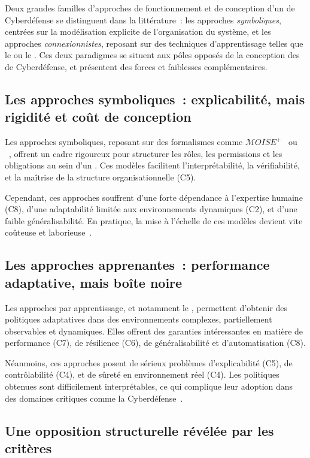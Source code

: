 Deux grandes familles d'approches de fonctionnement et de conception d'un  de Cyberdéfense se distinguent dans la littérature~: les approches \textit{symboliques}, centrées sur la modélisation explicite de l'organisation du système, et les approches \textit{connexionnistes}, reposant sur des techniques d'apprentissage telles que le  ou le . Ces deux paradigmes se situent aux pôles opposés de la conception des  de Cyberdéfense, et présentent des forces et faiblesses complémentaires.

\subsection{Les approches symboliques~: explicabilité, mais rigidité et coût de conception}

Les approches symboliques, reposant sur des formalismes comme $\mathcal{M}OISE^+$~\cite{hubner2002moise} ou ~\cite{Ferber2004}, offrent un cadre rigoureux pour structurer les rôles, les permissions et les obligations au sein d'un . Ces modèles facilitent l'interprétabilité, la vérifiabilité, et la maîtrise de la structure organisationnelle (C5).

Cependant, ces approches souffrent d'une forte dépendance à l'expertise humaine (C8), d'une adaptabilité limitée aux environnements dynamiques (C2), et d'une faible généralisabilité. En pratique, la mise à l'échelle de ces modèles devient vite coûteuse et laborieuse~\cite{Picard2006}.

\subsection{Les approches apprenantes~: performance adaptative, mais boîte noire}

Les approches par apprentissage, et notamment le , permettent d'obtenir des politiques adaptatives dans des environnements complexes, partiellement observables et dynamiques. Elles offrent des garanties intéressantes en matière de performance (C7), de résilience (C6), de généralisabilité et d'automatisation (C8).

Néanmoins, ces approches posent de sérieux problèmes d'explicabilité (C5), de contrôlabilité (C4), et de sûreté en environnement réel (C4). Les politiques obtenues sont difficilement interprétables, ce qui complique leur adoption dans des domaines critiques comme la Cyberdéfense~\cite{Gunning2019}.

\subsection{Une opposition structurelle révélée par les critères}

